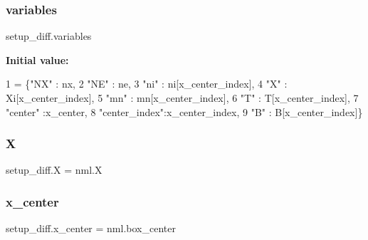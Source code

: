 \mbox{\label{namespacesetup__diff_a23282dde4ea089cf158422ee5386fc38}} 
\subsubsection{\texorpdfstring{variables}{variables}}
{\footnotesize\ttfamily setup\+\_\+diff.\+variables}

{\bfseries Initial value\+:}
\begin{DoxyCode}
1 =  \{\textcolor{stringliteral}{"NX"}       : nx,
2              \textcolor{stringliteral}{"NE"}       : ne,
3              \textcolor{stringliteral}{"ni"}       : ni[x\_center\_index],
4              \textcolor{stringliteral}{"X"}        : Xi[x\_center\_index],
5              \textcolor{stringliteral}{"mn"}       : mn[x\_center\_index],
6              \textcolor{stringliteral}{"T"}        : T[x\_center\_index],
7              \textcolor{stringliteral}{"center"}   :x\_center,
8              \textcolor{stringliteral}{"center\_index"}:x\_center\_index,
9              \textcolor{stringliteral}{"B"}        : B[x\_center\_index]\}
\end{DoxyCode}
\mbox{\label{namespacesetup__diff_ad01f7c1ee607d8a67926e30be25385f1}} 
\subsubsection{\texorpdfstring{X}{X}}
{\footnotesize\ttfamily setup\+\_\+diff.\+X = nml.\+X}

\mbox{\label{namespacesetup__diff_a644659f9e800f2cfde1ba2f023a7467b}} 
\subsubsection{\texorpdfstring{x\+\_\+center}{x\_center}}
{\footnotesize\ttfamily setup\+\_\+diff.\+x\+\_\+center = nml.\+box\+\_\+center}

\mbox{\label{namespacesetup__diff_af0fa7fe4226cbec9f01082f4f123749e}} 
